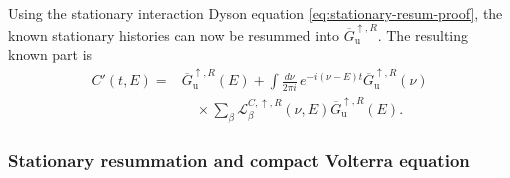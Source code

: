 \documentclass[
 reprint,
 superscriptaddress,
 amsmath,amssymb,
 aps,prb,
 longbibliography,
 floatfix
]{revtex4-2}
\begin{document}
Using the stationary interaction Dyson equation \eqref{eq:stationary-resum-proof}, the known stationary histories can now be resummed into $\overline G_{\mathrm u}^{\uparrow,R}$. The resulting known part is
\begin{equation}
\begin{aligned}
C'(t,E)
={}&
\overline G_{\mathrm u}^{\uparrow,R}(E)
+
\int\frac{d\nu}{2\pi i}\,
e^{-i(\nu-E)t}
\overline G_{\mathrm u}^{\uparrow,R}(\nu)
\\
&\quad\times
\sum_\beta
\mathcal L_\beta^{C,\uparrow,R}(\nu,E)
\overline G_{\mathrm u}^{\uparrow,R}(E).
\end{aligned}
\label{eq:Cprime-up-proof}
\end{equation}

\subsubsection{Stationary resummation and compact Volterra equation}
\end{document}
